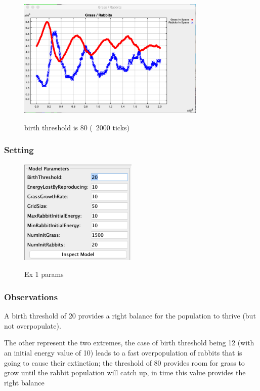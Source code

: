 \documentclass[11pt]{article}
\begin{document}
\begin{figure}[H]
\includegraphics[width=0.8\textwidth]{ex3-chart-80-2000}
\centering
\label{fig:ex3-80-2000}
\caption{ birth threshold is 80 (~2000 ticks) }
\end{figure}


\subsubsection{Setting}
\begin{figure}[H]
\includegraphics[width=0.5\textwidth]{ex1-params}
\centering
\label{fig:movement-directions}
\caption{ Ex 1 params }
\end{figure}

\subsubsection{Observations}
A birth threshold of 20 provides a right balance for the population to thrive (but not overpopulate).

The other represent the two extremes, the case of birth threshold being 12 (with an initial energy value of 10) leads to a fast overpopulation of rabbits that is going to cause their extinction; the threshold of 80 provides room for grass to grow until the rabbit population will catch up, in time this value provides the right balance
\end{document}
